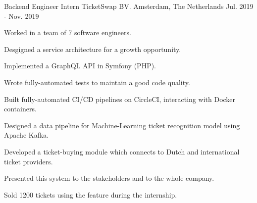 

\begin{cventries}

  \cventry
    {Backend Engineer Intern} %
    {TicketSwap BV.} %
    {Amsterdam, The Netherlands} %
    {Jul. 2019 - Nov. 2019} %
    {
      \begin{cvitems} %
        \item {Worked in a team of 7 software engineers.}
        \item {Desgigned a service architecture for a growth opportunity.}
        \item {Implemented a GraphQL API in Symfony (PHP).}
        \item {Wrote fully-automated tests to maintain a good code quality.}
        \item {Built fully-automated CI/CD pipelines on CircleCI, interacting with Docker containers.}
        \item {Designed a data pipeline for Machine-Learning ticket recognition model using Apache Kafka.}
        \item {Developed a ticket-buying module which connects to Dutch and international ticket providers.}
        \item {Presented this system to the stakeholders and to the whole company.}
        \item {Sold 1200 tickets using the feature during the internship.}
      \end{cvitems}
    }

\end{cventries}
